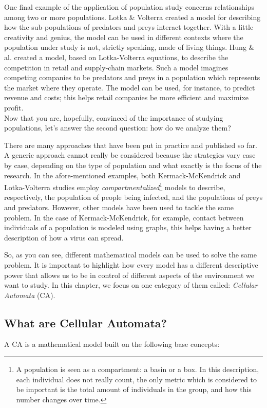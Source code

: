 One final example of the application of population study concerns relationships among two or more
populations. Lotka \& Volterra \cite{lotka-volterra} created a model for describing how
the sub-populations of predators and preys interact together.
With a little creativity and genius, the model can be used in different contexts where the population
under study is not, strictly speaking, made of living things. Hung \& al. \cite{hung-lv} created a model,
based on Lotka-Volterra equations, to describe the competition in retail and supply-chain markets. 
Such a model imagines competing companies to be predators and preys in a population which represents the market
where they operate. The model can be used, for instance, to predict revenue and costs; this helps retail companies be
more efficient and maximixe profit.\\

Now that you are, hopefully, convinced of the importance of studying populations, let's answer the
second question: how do we analyze them?

There are many approaches that have been put in practice and published so far. A generic approach cannot
really be considered because the strategies vary case by case, depending on the type of population
and what exactly is the focus of the research. In the afore-mentioned examples, both
Kermack-McKendrick and Lotka-Volterra studies employ
\textit{compartmentalized}\footnote{A population is seen as a compartment: a basin or a box.
In this description, each
individual does not really count, the only metric which is considered to be important
is the total amount of individuals
in the group, and how this number changes over time.}
models to describe,
respectively, the population of people being infected, and the populations of preys and predators.
However, other models have been used to tackle the same problem. In the case of Kermack-McKendrick,
for example, contact between individuals of a population is modeled using graphs, this helps
having a better description of how a virus can spread.

So, as you can see, different mathematical models can be used to solve the same problem. 
It is important to highlight how every model has a different descriptive power that allows us to
be in control of different aspects of the environment we want to study. In this chapter,
we focus on one category of them called: \textit{Cellular Automata} (CA).

\subsection{What are Cellular Automata?}
A CA is a mathematical model built on the following base concepts:

